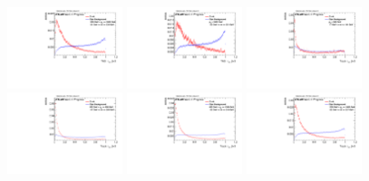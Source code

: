 \begin{figure}[H]
\includegraphics[width=0.3\textwidth]{sascha_input/Appendix/Distributions/top/distributions/beta3/h_assisted_tj_nSub32_3_bin5.pdf} \hspace{1mm}
\includegraphics[width=0.3\textwidth]{sascha_input/Appendix/Distributions/top/distributions/beta3/h_assisted_tj_nSub32_3_bin6.pdf} 
\bigskip
\includegraphics[width=0.3\textwidth]{sascha_input/Appendix/Distributions/top/distributions/beta3/h_normal_tj_nSub32_3_bin1.pdf} \hspace{1mm}
\includegraphics[width=0.3\textwidth]{sascha_input/Appendix/Distributions/top/distributions/beta3/h_normal_tj_nSub32_3_bin2.pdf} \hspace{1mm}
\includegraphics[width=0.3\textwidth]{sascha_input/Appendix/Distributions/top/distributions/beta3/h_normal_tj_nSub32_3_bin3.pdf} 
\bigskip
\includegraphics[width=0.3\textwidth]{sascha_input/Appendix/Distributions/top/distributions/beta3/h_normal_tj_nSub32_3_bin4.pdf} \hspace{1mm}

\end{figure}
